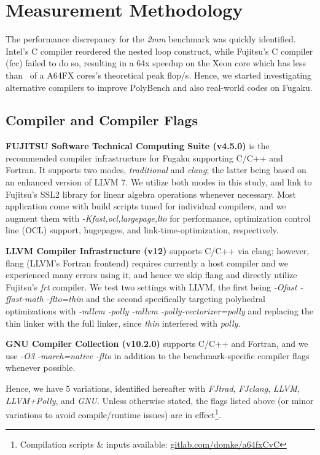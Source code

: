 \documentclass[conference,compsoc]{IEEEtran}
\begin{document}
\section{Measurement Methodology}\label{sec:metho}
The performance discrepancy for the \textit{2mm} benchmark was quickly identified. Intel's C compiler
reordered the nested loop construct, while Fujitsu's C compiler (fcc) failed to do so, resulting in a
64x speedup on the Xeon core which has less than \textonehalf~of a A64FX cores's theoretical peak flop/s.
Hence, we started investigating alternative compilers to improve PolyBench and also real-world codes on Fugaku.

\subsection{Compiler and Compiler Flags}\label{sec:metho:compiler}
\textbf{FUJITSU Software Technical Computing Suite (v4.5.0)} is the recommended compiler infrastructure
for Fugaku supporting C/C++ and Fortran. It supports two modes, \textit{traditional} and \textit{clang};
the latter being based on an enhanced version of LLVM 7. We utilize both modes in this study, and link
to Fujitsu's SSL2 library for linear algebra operations whenever necessary. Most application come with
build scripts tuned for individual compilers, and we augment them with \textit{-Kfast,ocl,largepage,lto}
for performance, optimization control line (OCL) support, hugepages, and link-time-optimization, respectively.

\textbf{LLVM Compiler Infrastructure (v12)} supports C/C++ via clang; however, flang (LLVM's Fortran frontend) requires
currently a host compiler and we experienced many errors using it, and hence we skip flang and directly utilize Fujitsu's \textit{frt} compiler.
We test two settings with LLVM, the first being \textit{-Ofast -ffast-math -flto=thin} and the second
specifically targeting polyhedral optimizations with \textit{-mllvm -polly -mllvm -polly-vectorizer=polly}
and replacing the thin linker with the full linker, since \textit{thin} interfered with \textit{polly}.

\textbf{GNU Compiler Collection (v10.2.0)} supports C/C++ and Fortran, and we use
\textit{-O3 -march=native -flto} in addition to the benchmark-specific compiler flags whenever possible.

Hence, we have 5 variations, identified hereafter with \textit{FJtrad}, \textit{FJclang}, \textit{LLVM},
\textit{LLVM+Polly}, and \textit{GNU}. Unless otherwise stated, the flags listed above (or minor
variations to avoid compile/runtime issues) are in effect\footnote{Compilation scripts \&  
inputs available: \url{gitlab.com/domke/a64fxCvC}}.
\end{document}
